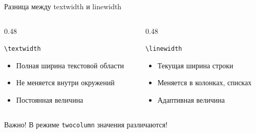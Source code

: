 \documentclass[utf8, 12pt]{beamer}
\begin{document}
\begin{frame}{Разница между textwidth и linewidth}
    \begin{columns}[T]
        \begin{column}{0.48\textwidth}
            \begin{block}{\texttt{\textbackslash textwidth}}
                \begin{itemize}
                    \item Полная ширина текстовой области
                    \item Не меняется внутри окружений
                    \item Постоянная величина
                \end{itemize}
            \end{block}
        \end{column}
        
        \begin{column}{0.48\textwidth}
            \begin{block}{\texttt{\textbackslash linewidth}}
                \begin{itemize}
                    \item Текущая ширина строки
                    \item Меняется в колонках, списках
                    \item Адаптивная величина
                \end{itemize}
            \end{block}
        \end{column}
    \end{columns}
    
    \vspace{0.5cm}
    
    \begin{alertblock}{Важно!}
        В режиме \texttt{twocolumn} значения различаются!
    \end{alertblock}
\end{frame}
\end{document}

